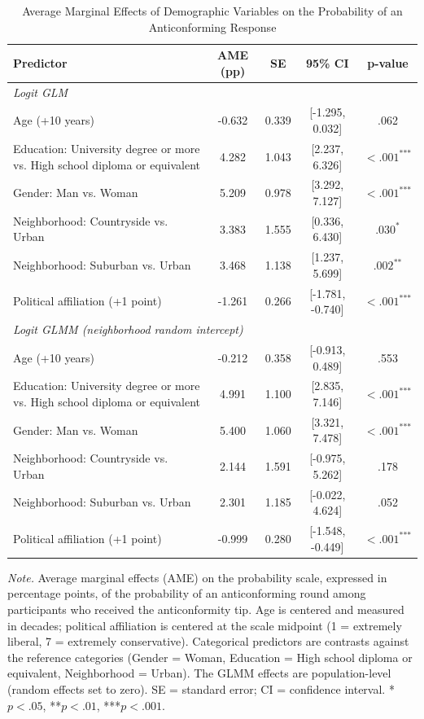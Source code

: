 \begin{table}[H]
\centering
\caption{Average Marginal Effects of Demographic Variables on the Probability of an Anticonforming Response}
\label{tab:ame_antic_demog}
\begingroup
\footnotesize
\renewcommand{\arraystretch}{0.90}

\begin{tabularx}{\linewidth}{Xcccc}
\toprule
\textbf{Predictor} & \textbf{AME (pp)} & \textbf{SE} & \textbf{95\% CI} & \textbf{p-value} \\
\midrule
\multicolumn{5}{l}{\textit{Logit GLM}} \\
Age (+10 years) & -0.632 & 0.339 & [-1.295, 0.032] & .062 \\
Education: University degree or more vs. High school diploma or equivalent & 4.282 & 1.043 & [2.237, 6.326] & $< .001^{\text{***}}$ \\
Gender: Man vs. Woman & 5.209 & 0.978 & [3.292, 7.127] & $< .001^{\text{***}}$ \\
Neighborhood: Countryside vs. Urban & 3.383 & 1.555 & [0.336, 6.430] & $.030^{\text{*}}$ \\
Neighborhood: Suburban vs. Urban & 3.468 & 1.138 & [1.237, 5.699] & $.002^{\text{**}}$ \\
Political affiliation (+1 point) & -1.261 & 0.266 & [-1.781, -0.740] & $< .001^{\text{***}}$ \\
\multicolumn{5}{l}{\textit{Logit GLMM (neighborhood random intercept)}} \\
Age (+10 years) & -0.212 & 0.358 & [-0.913, 0.489] & .553 \\
Education: University degree or more vs. High school diploma or equivalent & 4.991 & 1.100 & [2.835, 7.146] & $< .001^{\text{***}}$ \\
Gender: Man vs. Woman & 5.400 & 1.060 & [3.321, 7.478] & $< .001^{\text{***}}$ \\
Neighborhood: Countryside vs. Urban & 2.144 & 1.591 & [-0.975, 5.262] & .178 \\
Neighborhood: Suburban vs. Urban & 2.301 & 1.185 & [-0.022, 4.624] & .052 \\
Political affiliation (+1 point) & -0.999 & 0.280 & [-1.548, -0.449] & $< .001^{\text{***}}$ \\
\bottomrule
\end{tabularx}

\vspace{0.6em}
{\footnotesize
\setlength{\baselineskip}{12pt}
\textit{Note.} Average marginal effects (AME) on the probability scale, expressed in percentage points, of the probability of an anticonforming round among participants who received the anticonformity tip. Age is centered and measured in decades; political affiliation is centered at the scale midpoint (1 = extremely liberal, 7 = extremely conservative). Categorical predictors are contrasts against the reference categories (Gender = Woman, Education = High school diploma or equivalent, Neighborhood = Urban). The GLMM effects are population-level (random effects set to zero). SE = standard error; CI = confidence interval. *$p < .05$, **$p < .01$, ***$p < .001$.
\par}
\endgroup
\end{table}
